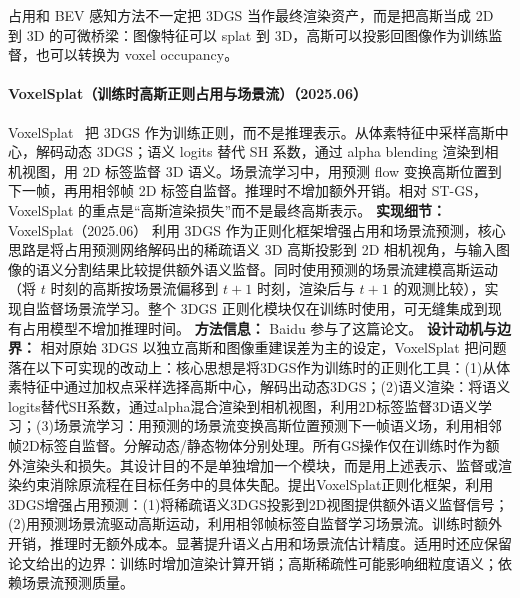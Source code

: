 占用和 BEV 感知方法不一定把 3DGS 当作最终渲染资产，而是把高斯当成 2D 到 3D 的可微桥梁：图像特征可以 splat 到 3D，高斯可以投影回图像作为训练监督，也可以转换为 voxel occupancy。
\paragraph{VoxelSplat（训练时高斯正则占用与场景流）（2025.06）}
VoxelSplat~\cite{2506_05563} 把 3DGS 作为训练正则，而不是推理表示。从体素特征中采样高斯中心，解码动态 3DGS；语义 logits 替代 SH 系数，通过 alpha blending 渲染到相机视图，用 2D 标签监督 3D 语义。场景流学习中，用预测 flow 变换高斯位置到下一帧，再用相邻帧 2D 标签自监督。推理时不增加额外开销。相对 ST-GS，VoxelSplat 的重点是“高斯渲染损失”而不是最终高斯表示。
\textbf{实现细节：} VoxelSplat（2025.06） 利用 3DGS 作为正则化框架增强占用和场景流预测，核心思路是将占用预测网络解码出的稀疏语义 3D 高斯投影到 2D 相机视角，与输入图像的语义分割结果比较提供额外语义监督。同时使用预测的场景流建模高斯运动（将 $t$ 时刻的高斯按场景流偏移到 $t+1$ 时刻，渲染后与 $t+1$ 的观测比较），实现自监督场景流学习。整个 3DGS 正则化模块仅在训练时使用，可无缝集成到现有占用模型不增加推理时间。
\textbf{方法信息：} Baidu 参与了这篇论文。
\textbf{设计动机与边界：} 相对原始 3DGS 以独立高斯和图像重建误差为主的设定，VoxelSplat 把问题落在以下可实现的改动上：核心思想是将3DGS作为训练时的正则化工具：(1)从体素特征中通过加权点采样选择高斯中心，解码出动态3DGS；(2)语义渲染：将语义logits替代SH系数，通过alpha混合渲染到相机视图，利用2D标签监督3D语义学习；(3)场景流学习：用预测的场景流变换高斯位置预测下一帧语义场，利用相邻帧2D标签自监督。分解动态/静态物体分别处理。所有GS操作仅在训练时作为额外渲染头和损失。其设计目的不是单独增加一个模块，而是用上述表示、监督或渲染约束消除原流程在目标任务中的具体失配。提出VoxelSplat正则化框架，利用3DGS增强占用预测：(1)将稀疏语义3DGS投影到2D视图提供额外语义监督信号；(2)用预测场景流驱动高斯运动，利用相邻帧标签自监督学习场景流。训练时额外开销，推理时无额外成本。显著提升语义占用和场景流估计精度。适用时还应保留论文给出的边界：训练时增加渲染计算开销；高斯稀疏性可能影响细粒度语义；依赖场景流预测质量。
